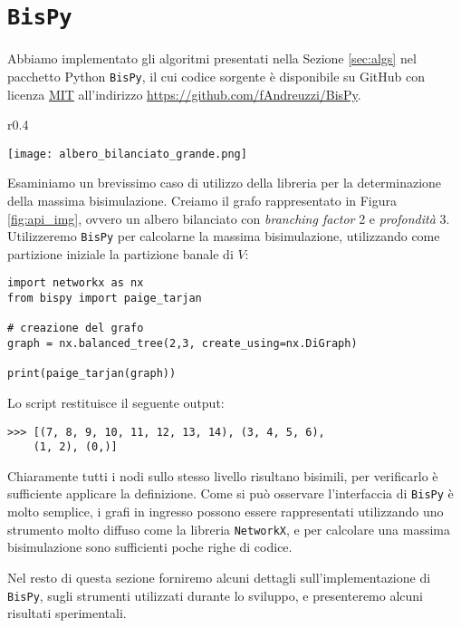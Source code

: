 \section{\texttt{BisPy}}
\label{sec:bispy}
Abbiamo implementato gli algoritmi presentati nella Sezione \ref{sec:algs} nel pacchetto Python \texttt{BisPy}, il cui codice sorgente è disponibile su GitHub con licenza \href{https://github.com/fAndreuzzi/BisPy/blob/master/LICENSE}{MIT} all'indirizzo \href{https://github.com/fAndreuzzi/BisPy}{https://github.com/fAndreuzzi/BisPy}.

\begin{wrapfigure}{r}{0.4\textwidth}
    \vspace{-1cm}
    \begin{center}
        \texttt{[image: albero\_bilanciato\_grande.png]}
    \end{center}
    \caption{}
    \label{fig:api_img}
\end{wrapfigure}
Esaminiamo un brevissimo caso di utilizzo della libreria per la determinazione della massima bisimulazione. Creiamo il grafo rappresentato in Figura \ref{fig:api_img}, ovvero un albero bilanciato con \emph{branching factor} 2 e \emph{profondità} 3. Utilizzeremo \texttt{BisPy} per calcolarne la massima bisimulazione, utilizzando come partizione iniziale la partizione banale di $V$:
\begin{verbatim}
import networkx as nx
from bispy import paige_tarjan

# creazione del grafo
graph = nx.balanced_tree(2,3, create_using=nx.DiGraph)

print(paige_tarjan(graph))
\end{verbatim}
Lo script restituisce il seguente output:
\begin{verbatim}
>>> [(7, 8, 9, 10, 11, 12, 13, 14), (3, 4, 5, 6),
    (1, 2), (0,)]
\end{verbatim}
Chiaramente tutti i nodi sullo stesso livello risultano bisimili, per verificarlo è sufficiente applicare la definizione. Come si può osservare l'interfaccia di \texttt{BisPy} è molto semplice, i grafi in ingresso possono essere rappresentati utilizzando uno strumento molto diffuso come la libreria \texttt{NetworkX}, e per calcolare una massima bisimulazione sono sufficienti poche righe di codice.

Nel resto di questa sezione forniremo alcuni dettagli sull'implementazione di \texttt{BisPy}, sugli strumenti utilizzati durante lo sviluppo, e presenteremo alcuni risultati sperimentali.




